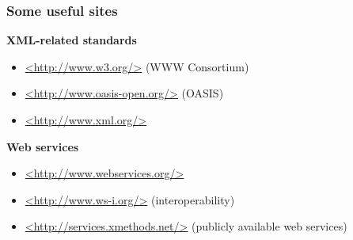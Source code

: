 

\frame
{
	\frametitle{Some useful sites}
	
	\textbf{XML-related standards}
		
	\begin{itemize}
	
		\item \url{<http://www.w3.org/>} (WWW Consortium)
		
		\item \url{<http://www.oasis-open.org/>} (OASIS)
		
		\item \url{<http://www.xml.org/>}
		
	\end{itemize}
	
	\textbf{Web services}
	
	\begin{itemize}
		
		\item \url{<http://www.webservices.org/>}
	
		\item \url{<http://www.ws-i.org/>} (interoperability)
		
		\item \url{<http://services.xmethods.net/>} (publicly available
		web services)
	
	\end{itemize}
}







%
%
%
%
%
%
%
%
%
